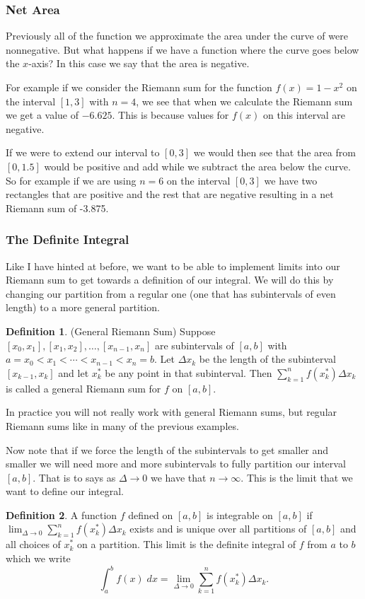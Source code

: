\documentclass[12pt,reqno]{article}
\theoremstyle{definition}
\newtheorem*{Definition}{Definition}
\begin{document}
\subsubsection{Net Area}

Previously all of the function we approximate the area under the curve of were nonnegative. But what happens if we have a function where the curve goes below the $x$-axis? In this case we say that the area is negative. 

For example if we consider the Riemann sum for the function $f(x) = 1 - x^2$ on the interval $[1, 3]$ with $n = 4$, we see that when we calculate the Riemann sum we get a value of $-6.625$. This is because values for $f(x)$ on this interval are negative. 

If we were to extend our interval to $[0, 3]$ we would then see that the area from $[0, 1.5]$ would be positive and add while we subtract the area below the curve. So for example if we are using $n = 6$ on the interval $[0, 3]$ we have two rectangles that are positive and the rest that are negative resulting in a net Riemann sum of -3.875. 

\subsubsection{The Definite Integral} 

Like I have hinted at before, we want to be able to implement limits into our Riemann sum to get towards a definition of our integral. We will do this by changing our partition from a regular one (one that has subintervals of even length) to a more general partition. 

\begin{Definition}
	(General Riemann Sum) Suppose $[x_0, x_1], [x_1, x_2], \ldots, [x_{n - 1}, x_n]$ are subintervals of $[a, b]$ with $a = x_0 < x_1 < \cdots < x_{n - 1} < x_n = b$. Let $\Delta x_k$ be the length of the subinterval $[x_{ k -1}, x_k]$ and let $x_{k}^*$ be any point in that subinterval. Then $\sum_{k = 1}^{n} f(x_{k}^{*}) \Delta x_k$ is called a general Riemann sum for $f$ on $[a, b]$. 
\end{Definition}

In practice you will not really work with general Riemann sums, but regular Riemann sums like in many of the previous examples. 

Now note that if we force the length of the subintervals to get smaller and smaller we will need more and more subintervals to fully partition our interval $[a, b]$. That is to says as $\Delta \to 0$ we have that $n \to \infty$. This is the limit that we want to define our integral. 
\begin{Definition}
	A function $f$ defined on $[a, b]$ is integrable on $[a, b]$ if $\lim_{\Delta \to 0} \sum_{k = 1}^{n} f(x_{k}^*) \Delta x_k$ exists and is unique over all partitions of $[a, b]$ and all choices of $x_{k}^{*}$ on a partition. This limit is the definite integral of $f$ from $a$ to $b$ which we write $$\int_{a}^{b} f(x) \; dx = \lim_{\Delta \to 0} \sum_{k = 1}^{n} f(x_{k}^*) \Delta x_k.$$
\end{Definition}
\end{document}
